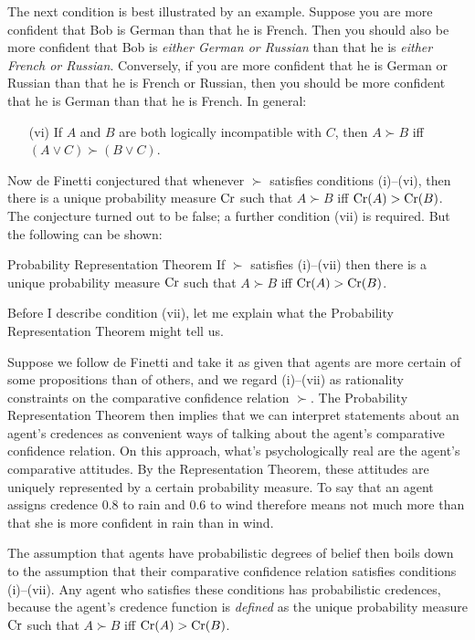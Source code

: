 The next condition is best illustrated by an example. Suppose you are
more confident that Bob is German than that he is French.  Then you
should also be more confident that Bob is \emph{either German or
  Russian} than that he is \emph{either French or
  Russian}. Conversely, if you are more confident that he is German or
Russian than that he is French or Russian, then you should be more
confident that he is German than that he is French. In general:
\begin{itemize}
\item[(vi)] If $A$ and $B$ are both logically incompatible with $C$,
  then $A \succ B$ iff $(A \lor C) \succ (B \lor C)$.
\end{itemize}

Now de Finetti conjectured that whenever $\succ$ satisfies conditions
(i)--(vi), then there is a unique probability measure $\text{Cr}$ such that
$A \succ B$ iff $\text{Cr}(A) > \text{Cr}(B)$. The conjecture turned out to be
false; a further condition (vii) is required. But the following can be
shown:
%
\begin{genericthm}{Probability Representation Theorem}
  If $\succ$ satisfies (i)--(vii) then there is a unique probability
  measure $\text{Cr}$ such that $A \succ B$ iff $\text{Cr}(A) > \text{Cr}(B)$. 
\end{genericthm}
%
Before I describe condition (vii), let me explain what the Probability
Representation Theorem might tell us.


Suppose we follow de Finetti and take it as given that agents are more
certain of some propositions than of others, and we regard (i)--(vii)
as rationality constraints on the comparative confidence relation
$\succ$. The Probability Representation Theorem then implies that we
can interpret statements about an agent's credences as convenient ways
of talking about the agent's comparative confidence relation. On this
approach, what's psychologically real are the agent's comparative
attitudes. By the Representation Theorem, these attitudes are
uniquely represented by a certain probability measure. To say that an
agent assigns credence $0.8$ to rain and $0.6$ to wind therefore means
not much more than that she is more confident in rain than in wind.

The assumption that agents have probabilistic degrees of belief then
boils down to the assumption that their comparative confidence relation
satisfies conditions (i)--(vii). Any agent who satisfies these
conditions has probabilistic credences, because the agent's credence
function is \emph{defined} as the unique probability measure $\text{Cr}$
such that $A \succ B$ iff $\text{Cr}(A) > \text{Cr}(B)$.

